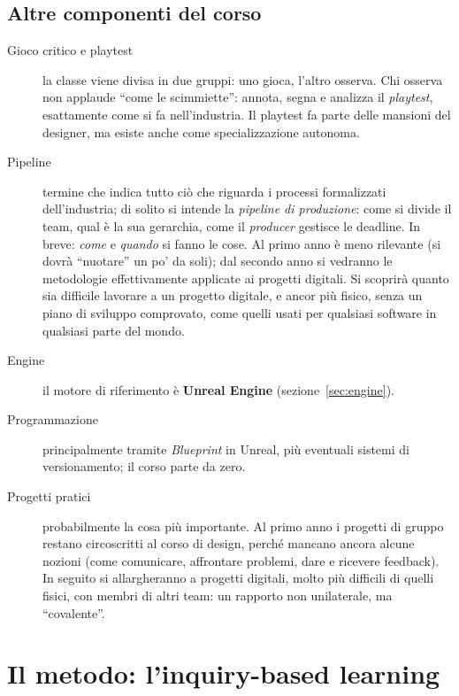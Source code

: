 \subsection{Altre componenti del corso}

\begin{description}
  \item[Gioco critico e playtest] la classe viene divisa in due gruppi: uno
        gioca, l'altro osserva. Chi osserva non applaude ``come le
        scimmiette'': annota, segna e analizza il \emph{playtest}, esattamente
        come si fa nell'industria. Il playtest fa parte delle mansioni del
        designer, ma esiste anche come specializzazione autonoma.
  \item[Pipeline] termine che indica tutto ciò che riguarda i processi
        formalizzati dell'industria; di solito si intende la \emph{pipeline di
        produzione}: come si divide il team, qual è la sua gerarchia, come il
        \emph{producer} gestisce le deadline. In breve: \emph{come} e
        \emph{quando} si fanno le cose. Al primo anno è meno rilevante (si
        dovrà ``nuotare'' un po' da soli); dal secondo anno si vedranno le
        metodologie effettivamente applicate ai progetti digitali. Si
        scoprirà quanto sia difficile lavorare a un progetto digitale, e
        ancor più fisico, senza un piano di sviluppo comprovato, come quelli
        usati per qualsiasi software in qualsiasi parte del mondo.
  \item[Engine] il motore di riferimento è \textbf{Unreal Engine}
        (sezione~\ref{sec:engine}).
  \item[Programmazione] principalmente tramite \emph{Blueprint} in Unreal,
        più eventuali sistemi di versionamento; il corso parte da zero.
  \item[Progetti pratici] probabilmente la cosa più importante. Al primo
        anno i progetti di gruppo restano circoscritti al corso di design,
        perché mancano ancora alcune nozioni (come comunicare, affrontare
        problemi, dare e ricevere feedback). In seguito si allargheranno a
        progetti digitali, molto più difficili di quelli fisici, con membri
        di altri team: un rapporto non unilaterale, ma ``covalente''.
\end{description}

\section{Il metodo: l'inquiry-based learning}
\label{sec:inquiry}


